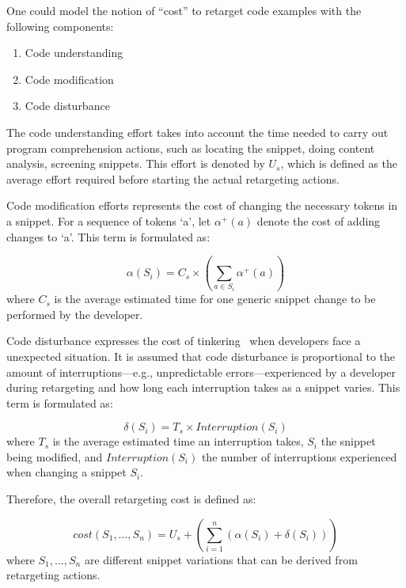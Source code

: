 One could model the notion of ``cost'' to retarget code examples with the following components:

\begin{enumerate}
	\item Code understanding
	\item Code modification
	\item Code disturbance
\end{enumerate}
 
The code understanding effort takes into account the time needed to carry out program comprehension actions, such as locating the snippet, doing content analysis, screening snippets. This effort is denoted by $U_{s}$, which is defined as the average effort required before starting the actual retargeting actions.

Code modification efforts represents the cost of changing the necessary tokens in a snippet. For a sequence of tokens `a', let $\alpha^{+}(a)$ denote the cost of adding changes to `a'. This term is formulated as: 

\begin{equation}
	\alpha(S_{i}) = C_{s} \times (\sum_{a \in S_{i}}\alpha^{+}(a))
	\label{costmodification}
\end{equation} where $C_{s}$ is the average estimated time for one generic snippet change to be performed by the developer.

Code disturbance expresses the cost of tinkering~\cite{Jadud:2006ir} when developers face a unexpected situation. It is assumed that code disturbance is proportional to the amount of interruptions---e.g., unpredictable errors---experienced by a developer during retargeting and how long each interruption takes as a snippet varies. This term is formulated as:

\begin{equation}
	\delta(S_{i}) = T_{s} \times Interruption(S_i)
	\label{costmodification}
\end{equation} where $T_{s}$ is the average estimated time an interruption takes, $S_i$ the snippet being modified, and $Interruption(S_i)$ the number of interruptions experienced when changing a snippet $S_i$. 

Therefore, the overall retargeting cost is defined as:

\begin{equation}
	cost(S_1, ..., S_n) = U_s + (\sum_{i=1}^{n}(\alpha(S_{i}) + \delta(S_{i})))
	\label{totalWork}
\end{equation} where $S_1, ..., S_n$ are different snippet variations that can be derived from retargeting actions.

